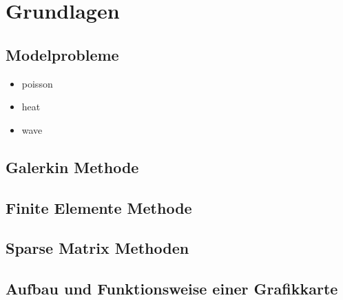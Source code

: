 \documentclass[crop=false]{standalone}
\begin{document}
  \section{Grundlagen} %
  \label{sec:background}

    \subsection{Modelprobleme} %
    \label{sub:modelprobleme}
      \begin{itemize}
        \item poisson
        \item heat
        \item wave
      \end{itemize}

    \subsection{Galerkin Methode} %
    \label{sub:galerkin_methode}


    \subsection{Finite Elemente Methode} %
    \label{sub:finite_elemente_methode}


    \subsection{Sparse Matrix Methoden} %
    \label{sub:sparse_matrix_methoden}


    \subsection{Aufbau und Funktionsweise einer Grafikkarte} %
    \label{sub:aufbau_und_funktionsweise_einer_grafikkarte}


\end{document}

